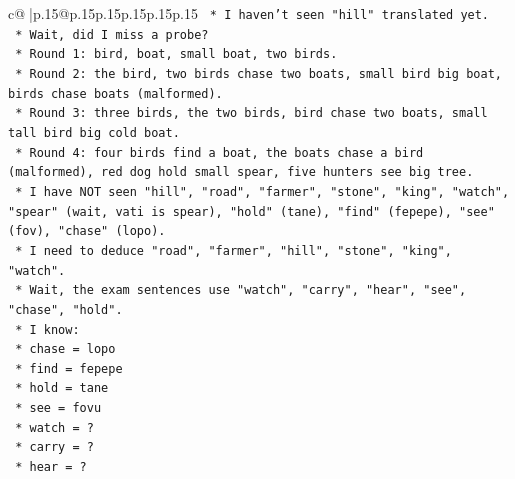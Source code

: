 \documentclass{article}
\begin{document}
{\begin{supertabular}{c@{$\;$}|p{.15\linewidth}@{}p{.15\linewidth}p{.15\linewidth}p{.15\linewidth}p{.15\linewidth}p{.15\linewidth}}
{{{\texttt{                                                *   I haven't seen "hill" translated yet.} \\
\texttt{                                                *   Wait, did I miss a probe?} \\
\texttt{                                                *   Round 1: bird, boat, small boat, two birds.} \\
\texttt{                                                *   Round 2: the bird, two birds chase two boats, small bird big boat, birds chase boats (malformed).} \\
\texttt{                                                *   Round 3: three birds, the two birds, bird chase two boats, small tall bird big cold boat.} \\
\texttt{                                                *   Round 4: four birds find a boat, the boats chase a bird (malformed), red dog hold small spear, five hunters see big tree.} \\
\texttt{                                                *   I have NOT seen "hill", "road", "farmer", "stone", "king", "watch", "spear" (wait, vati is spear), "hold" (tane), "find" (fepepe), "see" (fov), "chase" (lopo).} \\
\texttt{                                                *   I need to deduce "road", "farmer", "hill", "stone", "king", "watch".} \\
\texttt{                                                *   Wait, the exam sentences use "watch", "carry", "hear", "see", "chase", "hold".} \\
\texttt{                                                *   I know:} \\
\texttt{                                                    *   chase = lopo} \\
\texttt{                                                    *   find = fepepe} \\
\texttt{                                                    *   hold = tane} \\
\texttt{                                                    *   see = fovu} \\
\texttt{                                                    *   watch = ?} \\
\texttt{                                                    *   carry = ?} \\
\texttt{                                                    *   hear = ?} \\
}}}
\end{supertabular}}
\end{document}
